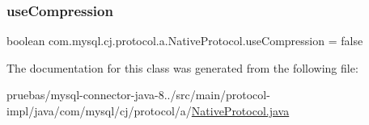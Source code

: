 \mbox{\label{classcom_1_1mysql_1_1cj_1_1protocol_1_1a_1_1_native_protocol_af6bd84239db260ea265898450bbc9e39}} 
\subsubsection{\texorpdfstring{use\+Compression}{useCompression}}
{\footnotesize\ttfamily boolean com.\+mysql.\+cj.\+protocol.\+a.\+Native\+Protocol.\+use\+Compression = false\hspace{0.3cm}{\ttfamily [protected]}}



The documentation for this class was generated from the following file\+:\begin{DoxyCompactItemize}
\item 
pruebas/mysql-\/connector-\/java-\/8../src/main/protocol-\/impl/java/com/mysql/cj/protocol/a/\mbox{\hyperlink{_native_protocol_8java}{Native\+Protocol.\+java}}\end{DoxyCompactItemize}
